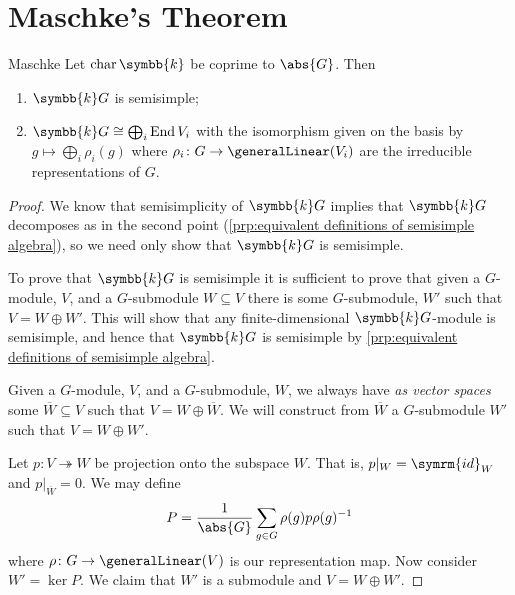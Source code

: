 \documentclass[fleqn]{NotesClass}
\renewcommand{\field}{\symbb{k}}
\newcommand{\id}{\symrm{id}}
\DeclareMathOperator{\End}{End}
\newcommand{\isomorphic}{\cong}
\DeclareMathOperator{\Char}{char}
\begin{document}
    \section{Maschke's Theorem}
    \begin{thm}{Maschke}{}
        Let \(\Char \field\) be coprime to \(\abs{G}\).
        Then
        \begin{enumerate}
            \item \(\field G\) is semisimple;
            \item \(\field G \isomorphic \bigoplus_i \End V_i\) with the isomorphism given on the basis by \(g \mapsto \bigoplus_i \rho_i(g)\) where \(\rho_i \colon G \to \generalLinear(V_i)\) are the irreducible representations of \(G\).
        \end{enumerate}
        \begin{proof}
            We know that semisimplicity of \(\field G\) implies that \(\field G\) decomposes as in the second point (\cref{prp:equivalent definitions of semisimple algebra}), so we need only show that \(\field G\) is semisimple.
            
            To prove that \(\field G\) is semisimple it is sufficient to prove that given a \(G\)-module, \(V\), and a \(G\)-submodule \(W \subseteq V\) there is some \(G\)-submodule, \(W'\) such that \(V = W \oplus W'\).
            This will show that any finite-dimensional \(\field G\)-module is semisimple, and hence that \(\field G\) is semisimple by \cref{prp:equivalent definitions of semisimple algebra}.
            
            Given a \(G\)-module, \(V\), and a \(G\)-submodule, \(W\), we always have \emph{as vector spaces} some \(\overbar{W} \subseteq V\) such that \(V = W \oplus \overbar{W}\).
            We will construct from \(\overbar{W}\) a \(G\)-submodule \(W'\) such that \(V = W \oplus W'\).
            
            Let \(p \colon V \twoheadrightarrow W\) be projection onto the subspace \(W\).
            That is, \(p|_W = \id_W\) and \(p|_{\overbar{W}} = 0\).
            We may define
            \begin{equation}
                P = \frac{1}{\abs{G}} \sum_{g \in G} \rho(g) p \rho(g)^{-1}
            \end{equation}
            where \(\rho \colon G \to \generalLinear(V)\) is our representation map.
            Now consider \(W' = \ker P\).
            We claim that \(W'\) is a submodule and \(V = W \oplus W'\).
            

\end{proof}
\end{thm}
\end{document}
